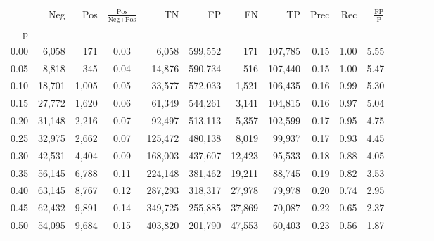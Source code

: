 \begin{tabular}{rrrcrrrrrrrrrrr}
\toprule
{} &     Neg &    Pos & $\frac{\text{Pos}}{\text{Neg}+\text{Pos}}$ &       TN &       FP &       FN &       TP &  Prec &   Rec & $\frac{\text{FP}}{\text{P}}$ \\
p    &         &        &                                            &          &          &          &          &       &       &                              \\
\midrule
0.00 &   6,058 &    171 &                                       0.03 &    6,058 &  599,552 &      171 &  107,785 &  0.15 &  1.00 &                         5.55 \\
0.05 &   8,818 &    345 &                                       0.04 &   14,876 &  590,734 &      516 &  107,440 &  0.15 &  1.00 &                         5.47 \\
0.10 &  18,701 &  1,005 &                                       0.05 &   33,577 &  572,033 &    1,521 &  106,435 &  0.16 &  0.99 &                         5.30 \\
0.15 &  27,772 &  1,620 &                                       0.06 &   61,349 &  544,261 &    3,141 &  104,815 &  0.16 &  0.97 &                         5.04 \\
0.20 &  31,148 &  2,216 &                                       0.07 &   92,497 &  513,113 &    5,357 &  102,599 &  0.17 &  0.95 &                         4.75 \\
0.25 &  32,975 &  2,662 &                                       0.07 &  125,472 &  480,138 &    8,019 &   99,937 &  0.17 &  0.93 &                         4.45 \\
0.30 &  42,531 &  4,404 &                                       0.09 &  168,003 &  437,607 &   12,423 &   95,533 &  0.18 &  0.88 &                         4.05 \\
0.35 &  56,145 &  6,788 &                                       0.11 &  224,148 &  381,462 &   19,211 &   88,745 &  0.19 &  0.82 &                         3.53 \\
0.40 &  63,145 &  8,767 &                                       0.12 &  287,293 &  318,317 &   27,978 &   79,978 &  0.20 &  0.74 &                         2.95 \\
0.45 &  62,432 &  9,891 &                                       0.14 &  349,725 &  255,885 &   37,869 &   70,087 &  0.22 &  0.65 &                         2.37 \\
0.50 &  54,095 &  9,684 &                                       0.15 &  403,820 &  201,790 &   47,553 &   60,403 &  0.23 &  0.56 &                         1.87 \\

\end{tabular}
